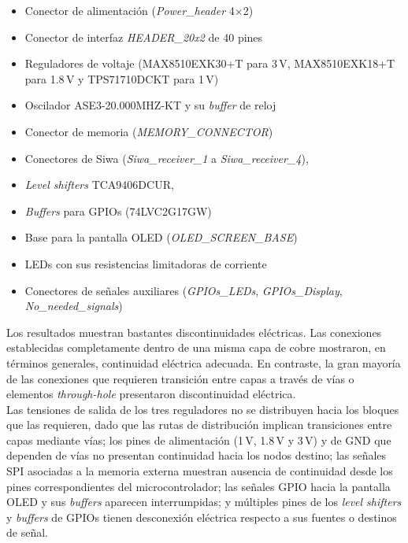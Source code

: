 \documentclass[journal,trans]{IEEEtran}
\begin{document}
\begin{itemize}
    \item Conector de alimentación (\textit{Power\_header} 4$\times$2)
    \item Conector de interfaz \textit{HEADER\_20x2} de 40 pines
    \item Reguladores de voltaje (MAX8510EXK30+T para 3\,V, MAX8510EXK18+T para 1.8\,V y TPS71710DCKT para 1\,V)
    \item Oscilador ASE3-20.000MHZ-KT y su \textit{buffer} de reloj
    \item Conector de memoria (\textit{MEMORY\_CONNECTOR})
    \item Conectores de Siwa (\textit{Siwa\_receiver\_1} a \textit{Siwa\_receiver\_4}), 
    \item \textit{Level shifters} TCA9406DCUR, 
    \item \textit{Buffers} para GPIOs (74LVC2G17GW)
    \item Base para la pantalla OLED (\textit{OLED\_SCREEN\_BASE})
    \item LEDs con sus resistencias limitadoras de corriente
    \item Conectores de señales auxiliares (\textit{GPIOs\_LEDs}, \textit{GPIOs\_Display}, \textit{No\_needed\_signals})
\end{itemize}


Los resultados muestran bastantes discontinuidades eléctricas. 
Las conexiones establecidas completamente dentro de una misma capa
de cobre mostraron, en términos generales, continuidad eléctrica adecuada. En contraste,
la gran mayoría de las conexiones que requieren transición entre capas a través de vías
o elementos \textit{through-hole} presentaron discontinuidad eléctrica.\\

Las tensiones de
salida de los tres reguladores no se distribuyen hacia los bloques que las requieren, dado
que las rutas de distribución implican transiciones entre capas mediante vías; los pines de
alimentación (1\,V, 1.8\,V y 3\,V) y de GND que dependen de
vías no presentan continuidad hacia los nodos destino; las señales SPI asociadas a la
memoria externa muestran ausencia de continuidad desde los pines correspondientes del
microcontrolador; las señales GPIO hacia la pantalla OLED y sus \textit{buffers} aparecen
interrumpidas; y múltiples pines de los \textit{level shifters} y \textit{buffers} de GPIOs tienen
desconexión eléctrica respecto a sus fuentes o destinos de señal.\\
\end{document}
